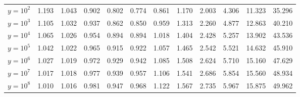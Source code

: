 \documentclass{article}
\theoremstyle{definition}
\begin{document}
\begin{table}[h!]
{\begin{tabular}{l | lllllllllll}
            $y = 10^{2}$            & 1.193                       & 1.043                       & 0.902                       & 0.802                       & 0.774                       & 0.861                       & 1.170                       & 2.003                       & 4.306                       & 11.323                      & 35.296                       \\
            $y = 10^{3}$            & 1.105                       & 1.032                       & 0.937                       & 0.862                       & 0.850                       & 0.959                       & 1.313                       & 2.260                       & 4.877                       & 12.863                      & 40.210                       \\
            $y = 10^{4}$            & 1.065                       & 1.026                       & 0.954                       & 0.894                       & 0.894                       & 1.018                       & 1.404                       & 2.428                       & 5.257                       & 13.902                      & 43.536                       \\
            $y = 10^{5}$            & 1.042                       & 1.022                       & 0.965                       & 0.915                       & 0.922                       & 1.057                       & 1.465                       & 2.542                       & 5.521                       & 14.632                      & 45.910                       \\
            $y = 10^{6}$            & 1.027                       & 1.019                       & 0.972                       & 0.929                       & 0.942                       & 1.085                       & 1.508                       & 2.624                       & 5.710                       & 15.160                      & 47.629                       \\
            $y = 10^{7}$            & 1.017                       & 1.018                       & 0.977                       & 0.939                       & 0.957                       & 1.106                       & 1.541                       & 2.686                       & 5.854                       & 15.560                      & 48.934                       \\
            $y = 10^{8}$            & 1.010                       & 1.016                       & 0.981                       & 0.947                       & 0.968                       & 1.122                       & 1.567                       & 2.735                       & 5.967                       & 15.875                      & 49.962                       \\

\end{tabular}}
\end{table}
\end{document}
